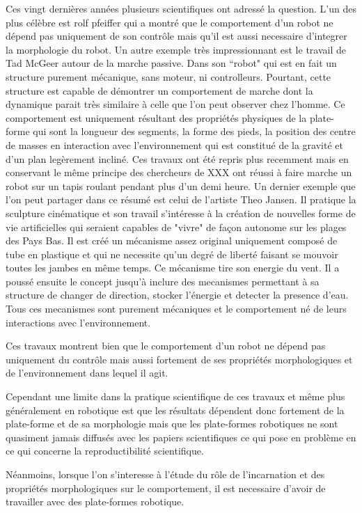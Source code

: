 Ces vingt dernières années plusieurs scientifiques ont adressé la question. L'un des plus célèbre est rolf pfeiffer qui a montré que le comportement d'un robot ne dépend pas uniquement de son contrôle mais qu'il est aussi necessaire d'integrer la morphologie du robot. Un autre exemple très impressionnant est le travail de Tad McGeer autour de la marche passive. Dans son “robot" qui est en fait un structure purement mécanique, sans moteur, ni controlleurs. Pourtant, cette structure est capable de démontrer un comportement de marche dont la dynamique parait très similaire à celle que l'on peut observer chez l'homme. Ce comportement est uniquement résultant des propriétés physiques de la plate-forme qui sont la longueur des segments, la forme des pieds, la position des centre de masses en interaction avec l'environnement qui est constitué de la gravité et d'un plan legèrement incliné. Ces travaux ont été repris plus recemment mais en conservant le même principe des chercheurs de XXX ont réussi à faire marche un robot sur un tapis roulant pendant plus d'un demi heure. Un dernier exemple que l'on peut partager dans ce résumé est celui de l'artiste Theo Jansen. Il pratique la sculpture cinématique et son travail s'intéresse à la création de nouvelles forme de vie artificielles qui seraient capables de "vivre" de façon autonome sur les plages des Pays Bas. Il est créé un mécanisme assez original uniquement composé de tube en plastique et qui ne necessite qu'un degré de liberté faisant se mouvoir toutes les jambes en même temps. Ce mécanisme tire son energie du vent. Il a poussé ensuite le concept jusqu'à inclure des mecanismes permettant à sa structure de changer de direction, stocker l'énergie et detecter la presence d'eau. Tous ces mecanismes sont purement mécaniques et le comportement né de leurs interactions avec l'environnement.


Ces travaux montrent bien que le comportement d'un robot ne dépend pas uniquement du contrôle mais aussi fortement de ses propriétés morphologiques et de l'environnement dans lequel il agit.

Cependant une limite dans la pratique scientifique de ces travaux et même plus généralement en robotique est que les résultats dépendent donc fortement de la plate-forme et de sa morphologie mais que les plate-formes robotiques ne sont quasiment jamais diffusés avec les papiers scientifiques ce qui pose en problème en ce qui concerne la reproductibilité scientifique.


Néanmoins, lorsque l'on s'interesse à l'étude du rôle de l'incarnation et des propriétés morphologiques sur le comportement, il est necessaire d'avoir de travailler avec des plate-formes robotique.


